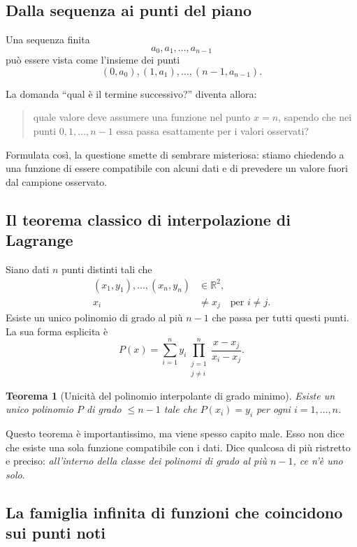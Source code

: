 \documentclass[10pt, a4paper]{article}
\theoremstyle{plain}
\newtheorem{theorem}{Teorema}
\theoremstyle{definition}
\theoremstyle{remark}
\begin{document}
\subsection{Dalla sequenza ai punti del piano}

Una sequenza finita
\[
a_0, a_1, \ldots, a_{n-1}
\]
può essere vista come l'insieme dei punti
\[
(0,a_0), (1,a_1), \ldots, (n-1,a_{n-1}).
\]

La domanda ``qual è il termine successivo?'' diventa allora:
\begin{quote}
quale valore deve assumere una funzione nel punto $x=n$, sapendo che nei punti
$0,1,\ldots,n-1$ essa passa esattamente per i valori osservati?
\end{quote}

Formulata così, la questione smette di sembrare misteriosa: stiamo chiedendo a
una funzione di essere compatibile con alcuni dati e di prevedere un valore
fuori dal campione osservato.

\subsection{Il teorema classico di interpolazione di Lagrange}

Siano dati $n$ punti distinti tali che
\[
\begin{aligned}
(x_1,y_1), \ldots, (x_n,y_n) &\in \mathbb{R}^2,\\
x_i &\neq x_j \quad \text{per } i \neq j.
\end{aligned}
\]
Esiste un unico polinomio di grado al più $n-1$ che passa per tutti questi
punti. La sua forma esplicita è
\begin{equation}
P(x)=\sum_{i=1}^{n} y_i \prod_{\substack{j=1 \\ j\neq i}}^{n}
\frac{x-x_j}{x_i-x_j}.
\label{eq:lagrange}
\end{equation}

\begin{theorem}[Unicità del polinomio interpolante di grado minimo]
Esiste un unico polinomio $P$ di grado $\leq n-1$ tale che
$P(x_i)=y_i$ per ogni $i=1,\ldots,n$.
\end{theorem}

Questo teorema è importantissimo, ma viene spesso capito male. Esso non dice
che esiste una sola funzione compatibile con i dati. Dice qualcosa di più
ristretto e preciso: \emph{all'interno della classe dei polinomi di grado al
più $n-1$, ce n'è uno solo}.

\subsection{La famiglia infinita di funzioni che coincidono sui punti noti}
\end{document}

